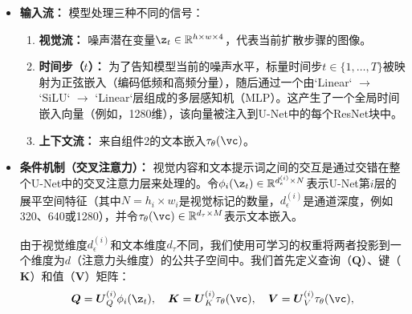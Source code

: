 \documentclass[../../book-main_zh.tex]{subfiles}
\begin{document}
\begin{itemize}
    \item \textbf{输入流：} 模型处理三种不同的信号：
    \begin{enumerate}
        \item \textbf{视觉流：} 噪声潜在变量$\z_t \in \mathbb{R}^{h \times w \times 4}$，代表当前扩散步骤的图像。
        \item \textbf{时间步（$t$）：} 为了告知模型当前的噪声水平，标量时间步$t \in \{1, \dots, T\}$被映射为正弦嵌入（编码低频和高频分量），随后通过一个由`Linear` $\to$ `SiLU` $\to$ `Linear`层组成的多层感知机（MLP）。这产生了一个全局时间嵌入向量（例如，1280维），该向量被注入到U-Net中的每个ResNet块中。
        \item \textbf{上下文流：} 来自组件2的文本嵌入$\tau_\theta(\vc)$。
    \end{enumerate}

    \item \textbf{条件机制（交叉注意力）：} 视觉内容和文本提示词之间的交互是通过交错在整个U-Net中的交叉注意力层来处理的。令$\phi_i(\z_t) \in \mathbb{R}^{d_\epsilon^{(i)} \times N}$表示U-Net第$i$层的展平空间特征（其中$N = h_i \times w_i$是视觉标记的数量，$d_\epsilon^{(i)}$是通道深度，例如320、640或1280），并令$\tau_\theta(\vc) \in \mathbb{R}^{d_\tau \times M}$表示文本嵌入。

    由于视觉维度$d_\epsilon^{(i)}$和文本维度$d_\tau$不同，我们使用可学习的权重将两者投影到一个维度为$d$（注意力头维度）的公共子空间中。我们首先定义查询（$\boldsymbol{Q}$）、键（$\boldsymbol{K}$）和值（$\boldsymbol{V}$）矩阵：
    \begin{equation}
        \boldsymbol{Q} = \boldsymbol{U}^{(i)}_{Q} \phi_i(\z_t), \quad
        \boldsymbol{K} = \boldsymbol{U}^{(i)}_{K} \tau_\theta(\vc), \quad
        \boldsymbol{V} = \boldsymbol{U}^{(i)}_{V} \tau_\theta(\vc),
    \end{equation}


\end{itemize}
\end{document}

